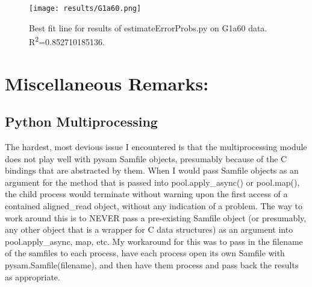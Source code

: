 \documentclass[11pt]{article}
\begin{document}
\begin{figure}[!htpb]
\centering
\texttt{[image: results/G1a60.png]}
\caption{Best fit line for results of estimateErrorProbs.py on G1a60 data. R\textsuperscript{2}=0.852710185136.}
\label{fig:g1a60}
\end{figure}
\pagebreak
\section*{Miscellaneous Remarks:}
\subsection*{Python Multiprocessing}
The hardest, most devious issue I encountered is that the multiprocessing module does not play well with pysam Samfile objects, presumably because of the C bindings that are abstracted by them. When I would pass Samfile objects as an argument for the method that is passed into pool.apply\_async() or pool.map(), the child process would terminate without warning upon the first access of a contained aligned\_read object, without any indication of a problem. The way to work around this is to NEVER pass a pre-existing Samfile object (or presumably, any other object that is a wrapper for C data structures) as an argument into pool.apply\_async, map, etc. My workaround for this was to pass in the filename of the samfiles to each process, have each process open its own Samfile with pysam.Samfile(filename), and then have them process and pass back the results as appropriate.
\end{document}
